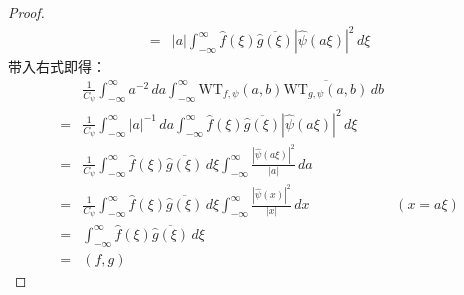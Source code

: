 \begin{proof}
\begin{align*}
        =&|a|\int_{-\infty}^{\infty}\hat{f}(\xi)\overline{\hat{g}(\xi)}|\hat{\psi}(a\xi)|^2\,d\xi
    \end{align*}
    带入右式即得：
    \begin{align*}
        &\frac{1}{C_{\psi}}\int_{-\infty}^{\infty}a^{-2}\,da\int_{-\infty}^{\infty}\mathrm{WT} _{f,\psi}(a,b)\overline{\mathrm{WT} _{g,\psi}(a,b)}\,db\\
        =&\frac{1}{C_{\psi}}\int_{-\infty}^{\infty}|a|^{-1}\,da\int_{-\infty}^{\infty}\hat{f}(\xi)\overline{\hat{g}(\xi)}|\hat{\psi}(a\xi)|^2\,d\xi\\
        =&\frac{1}{C_{\psi}}\int_{-\infty}^{\infty}\hat{f}(\xi)\overline{\hat{g}(\xi)}\,d\xi\int_{-\infty}^{\infty}\frac{|\hat{\psi}(a\xi)|^2}{|a|}\,da\\
        =&\frac{1}{C_{\psi}}\int_{-\infty}^{\infty}\hat{f}(\xi)\overline{\hat{g}(\xi)}\,d\xi\int_{-\infty}^{\infty}\frac{|\hat{\psi}(x)|^2}{|x|}\,dx&(x=a\xi)\\
        =&\int_{-\infty}^{\infty}\hat{f}(\xi)\overline{\hat{g}(\xi)}\,d\xi\\
        =&(f,g)
    \end{align*}
\end{proof}

